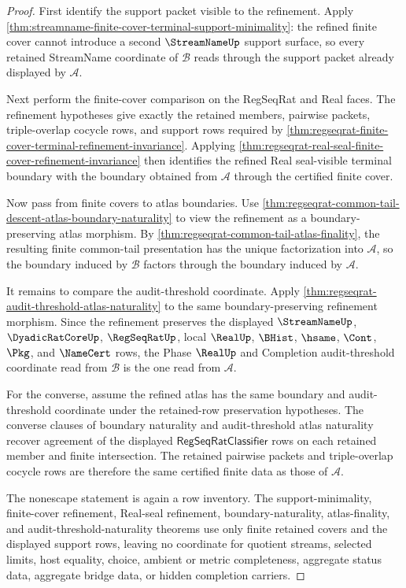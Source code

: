\begin{proof}
First identify the support packet visible to the refinement. Apply \autoref{thm:streamname-finite-cover-terminal-support-minimality}: the refined finite cover cannot introduce a second $\StreamNameUp$ support surface, so every retained StreamName coordinate of $\mathcal B$ reads through the support packet already displayed by $\mathcal A$.

Next perform the finite-cover comparison on the RegSeqRat and Real faces. The refinement hypotheses give exactly the retained members, pairwise packets, triple-overlap cocycle rows, and support rows required by \autoref{thm:regseqrat-finite-cover-terminal-refinement-invariance}. Applying \autoref{thm:regseqrat-real-seal-finite-cover-refinement-invariance} then identifies the refined Real seal-visible terminal boundary with the boundary obtained from $\mathcal A$ through the certified finite cover.

Now pass from finite covers to atlas boundaries. Use \autoref{thm:regseqrat-common-tail-descent-atlas-boundary-naturality} to view the refinement as a boundary-preserving atlas morphism. By \autoref{thm:regseqrat-common-tail-atlas-finality}, the resulting finite common-tail presentation has the unique factorization into $\mathcal A$, so the boundary induced by $\mathcal B$ factors through the boundary induced by $\mathcal A$.

It remains to compare the audit-threshold coordinate. Apply \autoref{thm:regseqrat-audit-threshold-atlas-naturality} to the same boundary-preserving refinement morphism. Since the refinement preserves the displayed $\StreamNameUp$, $\DyadicRatCoreUp$, $\RegSeqRatUp$, local $\RealUp$, $\BHist$, $\hsame$, $\Cont$, $\Pkg$, and $\NameCert$ rows, the Phase $\RealUp$ and Completion audit-threshold coordinate read from $\mathcal B$ is the one read from $\mathcal A$.

For the converse, assume the refined atlas has the same boundary and audit-threshold coordinate under the retained-row preservation hypotheses. The converse clauses of boundary naturality and audit-threshold atlas naturality recover agreement of the displayed $\mathsf{RegSeqRatClassifier}$ rows on each retained member and finite intersection. The retained pairwise packets and triple-overlap cocycle rows are therefore the same certified finite data as those of $\mathcal A$.

The nonescape statement is again a row inventory. The support-minimality, finite-cover refinement, Real-seal refinement, boundary-naturality, atlas-finality, and audit-threshold-naturality theorems use only finite retained covers and the displayed support rows, leaving no coordinate for quotient streams, selected limits, host equality, choice, ambient or metric completeness, aggregate status data, aggregate bridge data, or hidden completion carriers.
\end{proof}

